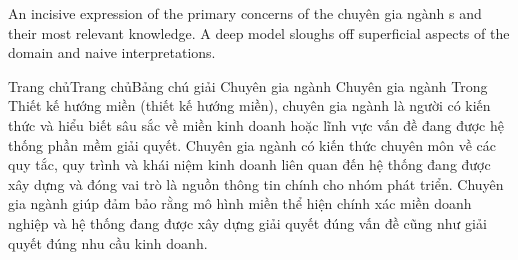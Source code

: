 An incisive expression of the primary concerns of the chuyên gia ngành s and their most relevant knowledge. A deep model sloughs off superficial aspects of the domain and naive interpretations.

Trang chủTrang chủBảng chú giải Chuyên gia ngành
Chuyên gia ngành
Trong Thiết kế hướng miền (thiết kế hướng miền), chuyên gia ngành là người có kiến thức và hiểu biết sâu sắc về miền kinh doanh hoặc lĩnh vực vấn đề đang được hệ thống phần mềm giải quyết. Chuyên gia ngành có kiến thức chuyên môn về các quy tắc, quy trình và khái niệm kinh doanh liên quan đến hệ thống đang được xây dựng và đóng vai trò là nguồn thông tin chính cho nhóm phát triển. Chuyên gia ngành giúp đảm bảo rằng mô hình miền thể hiện chính xác miền doanh nghiệp và hệ thống đang được xây dựng giải quyết đúng vấn đề cũng như giải quyết đúng nhu cầu kinh doanh.

